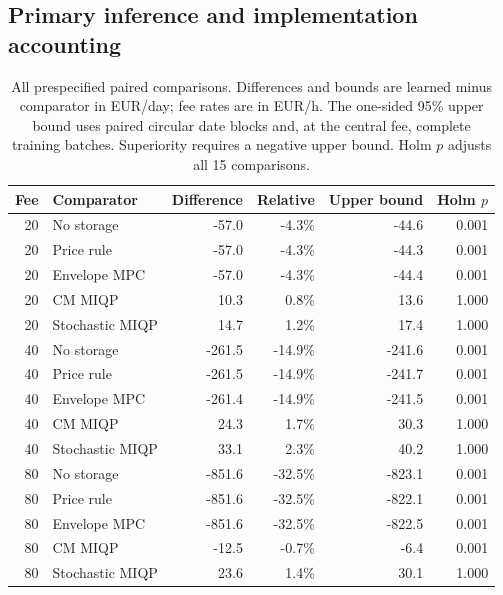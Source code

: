 \subsection{Primary inference and implementation accounting}

\begin{table}[tbp]
\centering
\caption{All prespecified paired comparisons. Differences and bounds are learned minus comparator in EUR/day; fee rates are in EUR/h. The one-sided 95\% upper bound uses paired circular date blocks and, at the central fee, complete training batches. Superiority requires a negative upper bound. Holm $p$ adjusts all 15 comparisons.}
\label{tab:paired-all}
\scriptsize
\begin{tabularx}{\linewidth}{r>{\raggedright\arraybackslash}Xrrrr}
\toprule
Fee & Comparator & Difference & Relative & Upper bound & Holm $p$ \\
\midrule
20 & No storage & -57.0 & -4.3\% & -44.6 & 0.001 \\
20 & Price rule & -57.0 & -4.3\% & -44.3 & 0.001 \\
20 & Envelope MPC & -57.0 & -4.3\% & -44.4 & 0.001 \\
20 & CM MIQP & 10.3 & 0.8\% & 13.6 & 1.000 \\
20 & Stochastic MIQP & 14.7 & 1.2\% & 17.4 & 1.000 \\
40 & No storage & -261.5 & -14.9\% & -241.6 & 0.001 \\
40 & Price rule & -261.5 & -14.9\% & -241.7 & 0.001 \\
40 & Envelope MPC & -261.4 & -14.9\% & -241.5 & 0.001 \\
40 & CM MIQP & 24.3 & 1.7\% & 30.3 & 1.000 \\
40 & Stochastic MIQP & 33.1 & 2.3\% & 40.2 & 1.000 \\
80 & No storage & -851.6 & -32.5\% & -823.1 & 0.001 \\
80 & Price rule & -851.6 & -32.5\% & -822.1 & 0.001 \\
80 & Envelope MPC & -851.6 & -32.5\% & -822.5 & 0.001 \\
80 & CM MIQP & -12.5 & -0.7\% & -6.4 & 0.001 \\
80 & Stochastic MIQP & 23.6 & 1.4\% & 30.1 & 1.000 \\
\bottomrule
\end{tabularx}
\end{table}

